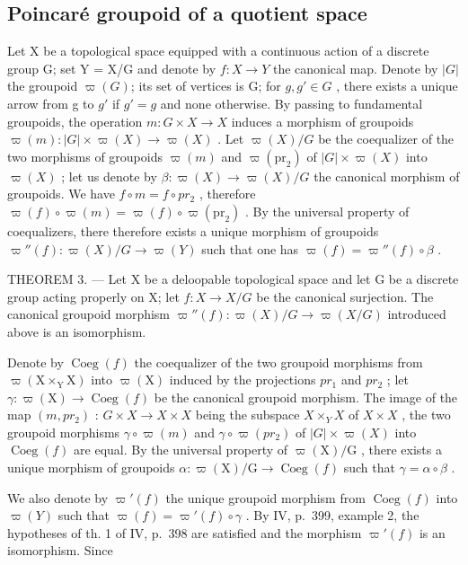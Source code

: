 \subsection{Poincaré groupoid of a quotient space}

Let X be a topological space equipped with a continuous action of a discrete group G; set Y = X/G and denote by \(f: X \to Y\) the canonical map. Denote by \(\lvert G\rvert\) the groupoid \(\varpi(G)\); its set of vertices is G; for \(g, g' \in G\) , there exists a unique arrow from g to \(g'\) if \(g' = g\) and none otherwise. By passing to fundamental groupoids, the operation \(m: G \times X \to X\) induces a morphism of groupoids \(\varpi(m): \lvert G\rvert \times \varpi(X) \to \varpi(X)\) . Let \(\varpi(X)/G\) be the coequalizer of the two morphisms of groupoids \(\varpi(m)\) and \(\varpi(\mathrm{pr}_{2})\) of \(\lvert G\rvert \times \varpi(X)\) into \(\varpi(X)\) ; let us denote by \(\beta: \varpi(X) \to \varpi(X)/G\) the canonical morphism of groupoids. We have \(f \circ m = f \circ pr_{2}\) , therefore \(\varpi(f) \circ \varpi(m) = \varpi(f) \circ \varpi(\mathrm{pr}_{2})\) . By the universal property of coequalizers, there therefore exists a unique morphism of groupoids \(\varpi''(f): \varpi(X)/G \to \varpi(Y)\) such that one has \(\varpi(f) = \varpi''(f) \circ \beta\) .

THEOREM 3. --- Let X be a deloopable topological space and let G be a discrete group acting properly on X; let \(f\colon X \to X/G\) be the canonical surjection. The canonical groupoid morphism \(\varpi''(f)\colon \varpi(X)/G \to \varpi(X/G)\) introduced above is an isomorphism.

Denote by \(\operatorname{Coeg}(f)\) the coequalizer of the two groupoid morphisms from \(\varpi(\mathrm{X} \times_{\mathrm{Y}} \mathrm{X})\) into \(\varpi(\mathrm{X})\) induced by the projections \(pr_{1}\) and \(pr_{2}\) ; let \(\gamma: \varpi(\mathrm{X}) \to \operatorname{Coeg}(f)\) be the canonical groupoid morphism. The image of the map \((m, pr_{2})\) : \(G \times X \to X \times X\) being the subspace \(X \times_{Y} X\) of \(X \times X\) , the two groupoid morphisms \(\gamma \circ \varpi(m)\) and \(\gamma \circ \varpi(pr_{2})\) of \(\lvert G\rvert \times \varpi(X)\) into \(\operatorname{Coeg}(f)\) are equal. By the universal property of \(\varpi(\mathrm{X})/\mathrm{G}\) , there exists a unique morphism of groupoids \(\alpha: \varpi(\mathrm{X})/\mathrm{G} \to \operatorname{Coeg}(f)\) such that \(\gamma = \alpha \circ \beta\) .

We also denote by \(\varpi'(f)\) the unique groupoid morphism from \(\operatorname{Coeg}(f)\) into \(\varpi(Y)\) such that \(\varpi(f) = \varpi'(f) \circ \gamma\) . By IV, p.~399, example 2, the hypotheses of th. 1 of IV, p.~398 are satisfied and the morphism \(\varpi'(f)\) is an isomorphism. Since


